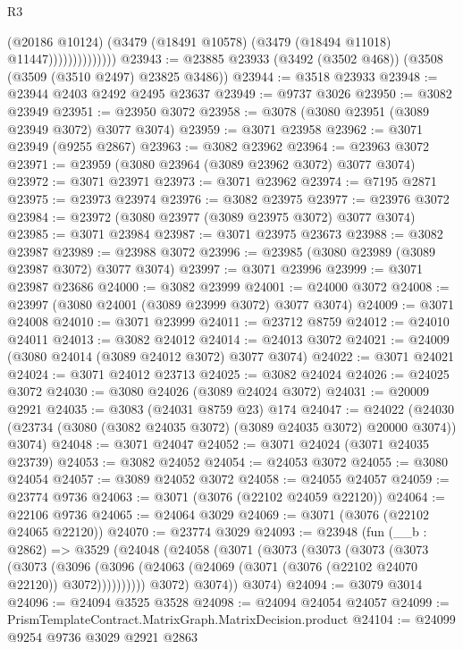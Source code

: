 \begin{lexlean}{R3}
\begin{coremodule}
                            (@20186 @10124)
                            (@3479 (@18491 @10578) (@3479 (@18494 @11018) @11447))))))))))))))
@23943 := @23885 @23933 (@3492 (@3502 @468)) (@3508 (@3509 (@3510 @2497) @23825 @3486))
@23944 := @3518 @23933
@23948 := @23944 @2403 @2492 @2495 @23637
@23949 := @9737 @3026
@23950 := @3082 @23949
@23951 := @23950 @3072
@23958 := @3078 (@3080 @23951 (@3089 @23949 @3072) @3077 @3074)
@23959 := @3071 @23958
@23962 := @3071 @23949 (@9255 @2867)
@23963 := @3082 @23962
@23964 := @23963 @3072
@23971 := @23959 (@3080 @23964 (@3089 @23962 @3072) @3077 @3074)
@23972 := @3071 @23971
@23973 := @3071 @23962
@23974 := @7195 @2871
@23975 := @23973 @23974
@23976 := @3082 @23975
@23977 := @23976 @3072
@23984 := @23972 (@3080 @23977 (@3089 @23975 @3072) @3077 @3074)
@23985 := @3071 @23984
@23987 := @3071 @23975 @23673
@23988 := @3082 @23987
@23989 := @23988 @3072
@23996 := @23985 (@3080 @23989 (@3089 @23987 @3072) @3077 @3074)
@23997 := @3071 @23996
@23999 := @3071 @23987 @23686
@24000 := @3082 @23999
@24001 := @24000 @3072
@24008 := @23997 (@3080 @24001 (@3089 @23999 @3072) @3077 @3074)
@24009 := @3071 @24008
@24010 := @3071 @23999
@24011 := @23712 @8759
@24012 := @24010 @24011
@24013 := @3082 @24012
@24014 := @24013 @3072
@24021 := @24009 (@3080 @24014 (@3089 @24012 @3072) @3077 @3074)
@24022 := @3071 @24021
@24024 := @3071 @24012 @23713
@24025 := @3082 @24024
@24026 := @24025 @3072
@24030 := @3080 @24026 (@3089 @24024 @3072)
@24031 := @20009 @2921
@24035 := @3083 (@24031 @8759 @23) @174
@24047 := @24022
    (@24030 (@23734 (@3080 (@3082 @24035 @3072) (@3089 @24035 @3072) @20000 @3074)) @3074)
@24048 := @3071 @24047
@24052 := @3071 @24024 (@3071 @24035 @23739)
@24053 := @3082 @24052
@24054 := @24053 @3072
@24055 := @3080 @24054
@24057 := @3089 @24052 @3072
@24058 := @24055 @24057
@24059 := @23774 @9736
@24063 := @3071 (@3076 (@22102 @24059 @22120))
@24064 := @22106 @9736
@24065 := @24064 @3029
@24069 := @3071 (@3076 (@22102 @24065 @22120))
@24070 := @23774 @3029
@24093 := @23948
    (fun (__b : @2862) =>
    @3529
      (@24048
        (@24058
          (@3071
            (@3073
              (@3073
                (@3073
                  (@3073
                    (@3073
                      (@3096
                        (@3096 (@24063 (@24069 (@3071 (@3076 (@22102 @24070 @22120)) @3072))))))))))
            @3072)
          @3074))
      @3074)
@24094 := @3079 @3014
@24096 := @24094 @3525 @3528
@24098 := @24094 @24054 @24057
@24099 := PrismTemplateContract.MatrixGraph.MatrixDecision.product
@24104 := @24099 @9254 @9736 @3029 @2921 @2863

\end{coremodule}
\end{lexlean}
